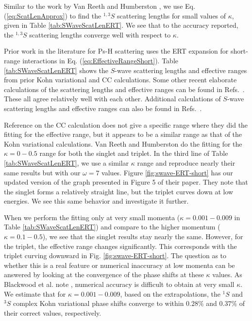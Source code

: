 \documentclass[preprint,showpacs,showkeys,preprintnumbers,amsmath,amssymb,longbibliography,pra,aps]{revtex4-1}
\begin{document}
Similar to the work by Van Reeth and Humberston \cite{VanReeth2003}, we use 
Eq. (\ref{eq:ScatLenApprox}) to find the $^{1,3}S$ scattering lengths for small 
values of $\kappa$, given in Table \ref{tab:SWaveScatLenERT}. We see that to 
the accuracy reported, the $^{1,3}S$ scattering lengths converge well with 
respect to $\kappa$.

Prior work in the literature for Ps-H scattering
\cite{Blackwood2002,Ivanov2002,Walters2004,VanReeth2003}
uses the ERT expansion for short-range 
interactions in Eq. (\ref{eq:EffectiveRangeShort}). Table
\ref{tab:SWaveScatLenERT} shows the $S$-wave scattering lengths and effective
ranges from prior Kohn variational \cite{VanReeth2003} and CC
\cite{Blackwood2002,Walters2004} calculations. Some other recent elaborate
calculations of the scattering lengths and effective ranges can be found in
Refs.~\cite{Sinha2000,Ivanov2001,Chiesa2002,Ivanov2002}.
These all agree relatively well with each 
other. Additional calculations of $S$-wave scattering lengths and effective 
ranges can also be found in
Refs.~\cite{Hara1975,Page1976,Drachman1975,
Drachman1976,Campbell1998,Adhikari1999,Adhikari2001b}.

Reference \cite{Blackwood2002} on the CC calculation does not give a specific 
range where they did the fitting for the effective range, but it appears to 
be a similar range as that of the Kohn variational calculations. Van Reeth 
and Humberston \cite{VanReeth2003} do the fitting for the $\kappa = 0-0.5$ 
range for both the singlet and triplet. In the third line of Table
\ref{tab:SWaveScatLenERT}, we use a similar $\kappa$ range and reproduce nearly
their same results but with our $\omega = 7$ values. Figure
\ref{fig:swave-ERT-short} has our updated version 
of the graph presented in Figure 5 of their paper. They note
that the singlet forms a relatively straight line, but the 
triplet curves down at low energies. We see this same behavior and 
investigate it further.

When we perform the fitting only at very small momenta
($\kappa = 0.001 - 0.009$ in
Table \ref{tab:SWaveScatLenERT}) and compare to the higher momentum
($\kappa = 0.1 - 0.5$), we see that the singlet results stay nearly the same. 
However, for the triplet, the effective range changes significantly. This 
corresponds with the triplet curving downward in
Fig. \ref{fig:swave-ERT-short}.
The question as to whether this is a real feature or numerical inaccuracy 
at low momenta can be answered by looking at the convergence of the phase 
shifts at these $\kappa$ values. As Blackwood et al. note \cite{Blackwood2002}
, numerical accuracy is difficult to obtain at very small $\kappa$. We 
estimate that for $\kappa = 0.001 - 0.009$, based on the extrapolations, the
$^1S$ and $^3S$ complex Kohn variational phase shifts converge to within
$0.28\%$ and $0.37\%$ of their correct values, respectively.
\end{document}
